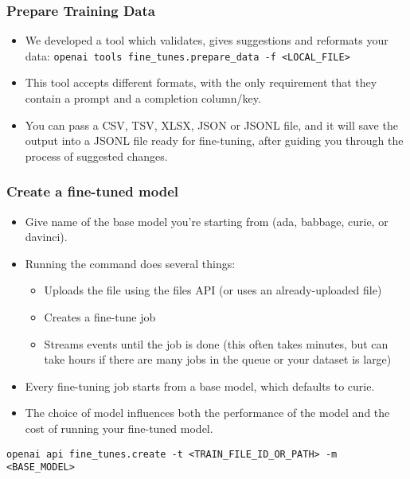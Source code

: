 \begin{frame}[fragile]\frametitle{Prepare Training Data}

\begin{itemize}
\item We developed a tool which validates, gives suggestions and reformats your data: \lstinline|openai tools fine_tunes.prepare_data -f <LOCAL_FILE>|
\item This tool accepts different formats, with the only requirement that they contain a prompt and a completion column/key. 
\item You can pass a CSV, TSV, XLSX, JSON or JSONL file, and it will save the output into a JSONL file ready for fine-tuning, after guiding you through the process of suggested changes.
\end{itemize}	 


\end{frame}


\begin{frame}[fragile]\frametitle{Create a fine-tuned model}

\begin{itemize}
\item Give name of the base model you're starting from (ada, babbage, curie, or davinci).
\item Running the command does several things:
	\begin{itemize}
	\item Uploads the file using the files API (or uses an already-uploaded file)
	\item Creates a fine-tune job
	\item Streams events until the job is done (this often takes minutes, but can take hours if there are many jobs in the queue or your dataset is large)
	\end{itemize}	 
\item Every fine-tuning job starts from a base model, which defaults to curie. 
\item The choice of model influences both the performance of the model and the cost of running your fine-tuned model.
\end{itemize}	 

\begin{lstlisting}
openai api fine_tunes.create -t <TRAIN_FILE_ID_OR_PATH> -m <BASE_MODEL>
\end{lstlisting}	

\end{frame}


